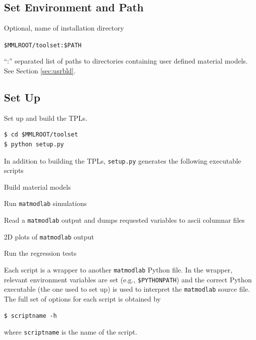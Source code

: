 \documentclass[12pt,report,strict]{SANDreport/SANDreport}
\newcommand{\mml}{\texttt{matmodlab}}
\begin{document}
\subsection{Set Environment and Path}
\label{sec:setup}

\begin{description}[leftmargin=!,labelwidth=\widthof{\texttt{MMLMTLS}}]
  \item[\texttt{MMLROOT}] Optional, name of installation directory
  \item[\texttt{PATH}] \verb|$MMLROOT/toolset:$PATH|
  \item[\texttt{MMLMTLS}] ``:'' separated list of paths to directories
  containing user defined material models. See Section \ref{sec:usrbld}.
\end{description}

\subsection{Set Up}
\label{sec:setup-1}
Set up and build the TPLs.
%
\begin{verbatim}
$ cd $MMLROOT/toolset
$ python setup.py
\end{verbatim}
%
In addition to building the TPLs, \texttt{setup.py} generates the following
executable scripts
%
\begin{description}[leftmargin=!,labelwidth=\widthof{\texttt{buildmtls}}]
  \item[\texttt{buildmtls}] Build material models
  \item[\texttt{mml}] Run \mml{} simulations
  \item[\texttt{exdump}] Read a \mml{} output and dumps requested variables
  to ascii columnar files
  \item[\texttt{mmv}] 2D plots of \mml{} output
  \item[\texttt{runtests}] Run the regression tests
\end{description}
%
Each script is a wrapper to another \mml{} Python file. In the wrapper,
relevant environment variables are set (e.g., \verb|$PYTHONPATH|) and the
correct Python executable (the one used to set up) is used to interpret the
\mml{} source file.  The full set of options for each script is obtained by
%
\begin{verbatim}
$ scriptname -h
\end{verbatim}
%
where \texttt{scriptname} is the name of the script.
\end{document}
